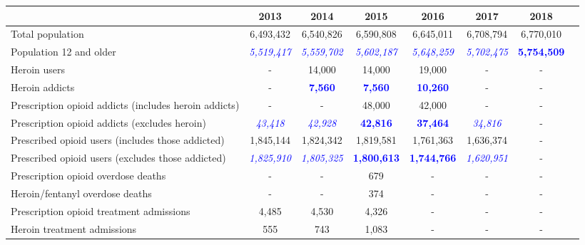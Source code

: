 \documentclass[12pt]{article}
\begin{document}
 \begin{sidewaystable} 
\begin{tabular}{|l|c|c|c|c|c|c|l}
\hline
 & \footnotesize{2013} & \footnotesize{2014} & \footnotesize{2015} & \footnotesize{2016} & \footnotesize{2017} & \footnotesize{2018}\\
\hline
\footnotesize
Total population & \footnotesize{6,493,432} & \footnotesize{6,540,826} & \footnotesize{6,590,808} & \footnotesize{6,645,011} & \footnotesize{6,708,794} & \footnotesize{6,770,010}\\
\footnotesize
Population 12 and older & \footnotesize{\textit{\textcolor{blue}{5,519,417}}} & \footnotesize{\textit{\textcolor{blue}{5,559,702}}} & \footnotesize{\textit{\textcolor{blue}{5,602,187}}} & \footnotesize{\textit{\textcolor{blue}{5,648,259}}} & \footnotesize{\textit{\textcolor{blue}{5,702,475}}} & \footnotesize{\textbf{\textcolor{blue}{5,754,509}}} \\
\footnotesize
Heroin users& - &\footnotesize{14,000} & \footnotesize{14,000} & \footnotesize{19,000}  & - &-\\
\footnotesize
Heroin addicts & - &\footnotesize{\textcolor{blue}{\textbf{7,560}}} & \footnotesize{\textcolor{blue}{\textbf{7,560}}} & \footnotesize{\textcolor{blue}{\textbf{10,260}}}  & - &-\\
\footnotesize
Prescription opioid addicts (includes heroin addicts) & - &  - & \footnotesize{48,000}
& \footnotesize{42,000} & - &-\\
\footnotesize
Prescription opioid addicts (excludes heroin) & \footnotesize{\textit{\textcolor{blue}{43,418}}} & \footnotesize{\textit{\textcolor{blue}{42,928}}} & \footnotesize{\textcolor{blue}{\textbf{42,816}}
} & \footnotesize{\textcolor{blue}{\textbf{37,464}}} & \footnotesize{\textit{\textcolor{blue}{34,816}}} &-\\
\footnotesize
Prescribed opioid users (includes those addicted) & \footnotesize{1,845,144} &\footnotesize{1,824,342} & \footnotesize{1,819,581} & \footnotesize{1,761,363} &  \footnotesize{1,636,374} &-\\
\footnotesize
Prescribed opioid users (excludes those addicted)   & \footnotesize{\textit{\textcolor{blue}{1,825,910}}} &\footnotesize{\textit{\textcolor{blue}{1,805,325}
}} & \footnotesize{\textcolor{blue}{\textbf{1,800,613}}} & \footnotesize{\textcolor{blue}{\textbf{1,744,766}}} &  \footnotesize{\textit{\textcolor{blue}{1,620,951}
}} &-\\
\footnotesize
Prescription opioid overdose deaths & - & - & \footnotesize{679} & -  & - &-\\
\footnotesize
Heroin/fentanyl overdose deaths & - & - & \footnotesize{374} & -  & - &-\\
\footnotesize
Prescription opioid treatment admissions & \footnotesize{4,485} & \footnotesize{4,530} & \footnotesize{4,326} & -  & - &-\\
\footnotesize
Heroin treatment admissions & \footnotesize{555} & \footnotesize{743} & \footnotesize{1,083} & -  & - &-\\
\hline
\end{tabular} \\
\label{tab:template}


\end{sidewaystable}
\end{document}
